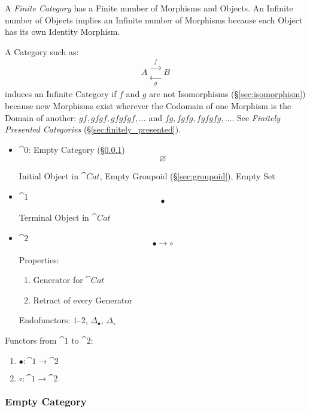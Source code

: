 A \emph{Finite Category} has a Finite number of Morphisms and Objects.
An Infinite number of Objects implies an Infinite number of Morphisms
because each Object has its own Identity Morphism.

A Category such as:
\[
  A
  \begin{matrix}
  \xrightarrow{\;\;f\;\;}\\
  \xleftarrow[\;\;g\;\;]{}
  \end{matrix}
  B
\]
induces an Infinite Category if $f$ and $g$ are not Isomorphisms
(\S\ref{sec:isomorphism}) because new Morphisms exist wherever the
Codomain of one Morphism is the Domain of another: $gf, gfgf, gfgfgf,
\ldots$ and $fg, fgfg, fgfgfg, \ldots$. See \emph{Finitely Presented
  Categories} (\S\ref{sec:finitely_presented}).

\begin{itemize}
  \item $\cat{0}$: Empty Category (\S\ref{sec:empty_category})
    \[
      \varnothing
    \]

    Initial Object in $\cat{Cat}$, Empty Groupoid
    (\S\ref{sec:groupoid}), Empty Set

  \item $\cat{1}$
    \[
      \bullet
    \]

    Terminal Object in $\cat{Cat}$

  \item $\cat{2}$
    \[
      \bullet \longrightarrow \circ
    \]

    Properties:
    \begin{enumerate}
    \item Generator for $\cat{Cat}$ %
    \item Retract of every Generator
    \end{enumerate}

    Endofunctors: $1_\cat{2}$, $\Delta_\bullet$, $\Delta_\circ$

\end{itemize}

Functors from $\cat{1}$ to $\cat{2}$:
\begin{enumerate}
  \item $\bullet : \cat{1} \rightarrow \cat{2}$
  \item $\circ : \cat{1} \rightarrow \cat{2}$
\end{enumerate}



\subsubsection{Empty Category}\label{sec:empty_category}

